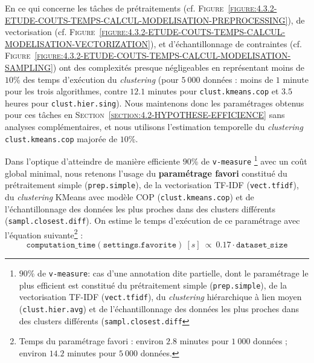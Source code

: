 			En ce qui concerne les tâches de prétraitements (cf. \textsc{Figure~\ref{figure:4.3.2-ETUDE-COUTS-TEMPS-CALCUL-MODELISATION-PREPROCESSING}}), de vectorisation (cf. \textsc{Figure~\ref{figure:4.3.2-ETUDE-COUTS-TEMPS-CALCUL-MODELISATION-VECTORIZATION}}), et d'échantillonnage de contraintes (cf. \textsc{Figure~\ref{figure:4.3.2-ETUDE-COUTS-TEMPS-CALCUL-MODELISATION-SAMPLING}}) ont des complexités presque négligeables en représentant moins de $10$\% des temps d'exécution du \textit{clustering} (pour $5~000$ données : moins de $1$ minute pour les trois algorithmes, contre $12.1$ minutes pour \texttt{clust.kmeans.cop} et $3.5$ heures pour \texttt{clust.hier.sing}).
			Nous maintenons donc les paramétrages obtenus pour ces tâches en \textsc{Section~\ref{section:4.2-HYPOTHESE-EFFICIENCE}} sans analyses complémentaires, et nous utilisons l'estimation temporelle du \textit{clustering} \texttt{clust.kmeans.cop} majorée de $10$\%.
			
			\begin{leftBarSummary}
				Dans l'optique d'atteindre de manière efficiente $90$\% de \texttt{v-measure}
				\footnote{$90$\% de \texttt{v-measure}: cas d'une annotation dite partielle, dont le paramétrage le plus efficient est constitué du prétraitement simple (\texttt{prep.simple}), de la vectorisation TF-IDF (\texttt{vect.tfidf}), du \textit{clustering} hiérarchique à lien moyen (\texttt{clust.hier.avg}) et de l'échantillonnage des données les plus proches dans des clusters différents (\texttt{sampl.closest.diff}}
				avec un coût global minimal, nous retenons l'usage du \textbf{paramétrage favori} constitué du prétraitement simple (\texttt{prep.simple}), de la vectorisation TF-IDF (\texttt{vect.tfidf}), du \textit{clustering} KMeans avec modèle COP (\texttt{clust.kmeans.cop}) et de l'échantillonnage des données les plus proches dans des clusters différents (\texttt{sampl.closest.diff}).
				On estime le temps d'exécution de ce paramétrage avec l'équation suivante\footnote{Temps du paramétrage favori : environ $2.8$ minutes pour $1~000$ données ; environ $14.2$ minutes pour $5~000$ données.} :
				\begin{equation}
					\label{equation:4.3.2-ETUDE-COUTS-TEMPS-CALCUL-PARAMETRAGE-FAVORI}
					\texttt{computation\_time}(\texttt{settings.favorite})~[s]~
					\propto~0.17 \cdot \texttt{dataset\_size}
				\end{equation}
			\end{leftBarSummary}
	
